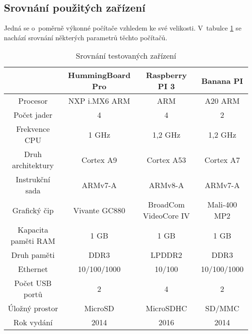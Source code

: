 \subsection{Srovnání použitých zařízení}
Jedná se o~poměrně výkonné počítače vzhledem ke své velikosti. V~tabulce \ref{srovnaniPC} se nachází srovnání některých parametrů těchto počítačů.
\begin{table}[H]
\centering
\caption{Srovnání testovaných zařízení}
\begin{tabular} { |c|c|c|c| }
\hline
{}                  & {HummingBoard Pro}    & {Raspberry PI 3}      & {Banana PI}          \\ \hline
Procesor            & NXP i.MX6 ARM         & ARM                   & A20 ARM              \\ \hline
Počet jader         & 4                     & 4                     & 2                    \\ \hline
Frekvence CPU       & 1 GHz                 & 1,2 GHz               & 1,2 GHz              \\ \hline
Druh architektury   & Cortex A9             & Cortex A53            & Cortex A7            \\ \hline
Instrukční sada     & ARMv7-A               & ARMv8-A               & ARMv7-A              \\ \hline
Grafický čip        & Vivante GC880         & BroadCom VideoCore IV & Mali-400 MP2         \\ \hline
Kapacita paměti RAM & 1 GB                  & 1 GB                  & 1 GB                 \\ \hline
Druh paměti         & DDR3                  & LPDDR2                & DDR3                 \\ \hline
Ethernet            & 10/100/1000           & 10/100                & 10/100/1000          \\ \hline
Počet USB portů     & 2                     & 4                     & 2                    \\ \hline
Úložný prostor      & MicroSD               & MicroSDHC             & SD/MMC               \\ \hline
Rok vydání          & 2014                  & 2016                  & 2014                 \\ \hline
\end{tabular}
\label{srovnaniPC}
\end{table}
